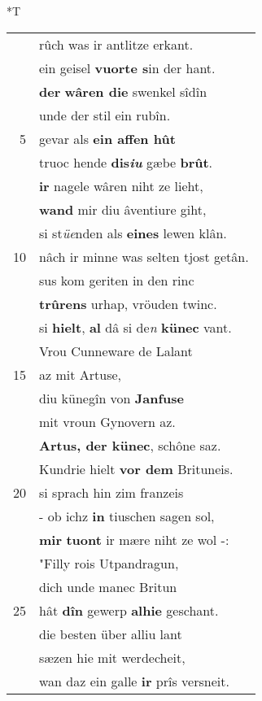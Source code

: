 \documentclass[8pt,a4paper,notitlepage]{article}
\begin{document}
\begin{table}[ht]
\begin{minipage}[t]{0.5\linewidth}
\end{minipage}
\hspace{0.5cm}
\begin{minipage}[t]{0.5\linewidth}
\small
\begin{center}*T
\end{center}
\begin{tabular}{rl}
 & rûch was ir antlitze erkant.\\ 
 & ein geisel \textbf{vuorte s}in der hant.\\ 
 & \textbf{der} \textbf{wâren die} swenkel sîdîn\\ 
 & unde der stil ein rubîn.\\ 
5 & gevar als \textbf{ein affen hût}\\ 
 & truoc hende \textbf{dis\textit{iu}} gæbe \textbf{brût}.\\ 
 & \textbf{ir} nagele wâren niht ze lieht,\\ 
 & \textbf{wand} mir diu âventiure giht,\\ 
 & si st\textit{üe}nden als \textbf{eines} lewen klân.\\ 
10 & nâch ir minne was selten tjost getân.\\ 
 & sus kom geriten in den rinc\\ 
 & \textbf{trûrens} urhap, vröuden twinc.\\ 
 & si \textbf{hielt}, \textbf{al} dâ si de\textit{n} \textbf{künec} vant.\\ 
 & Vrou Cunneware de Lalant\\ 
15 & az mit Artuse,\\ 
 & diu künegîn von \textbf{Janfuse}\\ 
 & mit vroun Gynovern az.\\ 
 & \textbf{Artus, der künec}, schône saz.\\ 
 & Kundrie hielt \textbf{vor dem} Brituneis.\\ 
20 & si sprach hin zim franzeis\\ 
 & - ob ichz \textbf{in} tiuschen sagen sol,\\ 
 & \textbf{mir} \textbf{tuont} ir mære niht ze wol -:\\ 
 & "Filly rois Utpandragun,\\ 
 & dich unde manec Britun\\ 
25 & hât \textbf{dîn} gewerp \textbf{alhie} geschant.\\ 
 & die besten über alliu lant\\ 
 & sæzen hie mit werdecheit,\\ 
 & wan daz ein galle \textbf{ir} prîs versneit.\\ 

\end{tabular}
\end{minipage}
\end{table}
\end{document}
